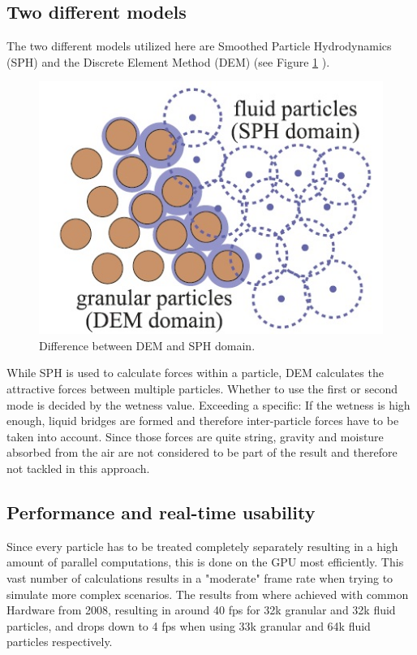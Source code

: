 \subsection{Two different models}
The two different models utilized here are Smoothed Particle Hydrodynamics (SPH) \cite{rungjiratananon2008real} and the Discrete Element Method (DEM) \cite{rungjiratananon2008real} (see Figure \ref{fig:domains} ).

\begin{figure}[htb]
	\centering
	\includegraphics[width=\linewidth]{RSKN08/domains.jpg}
	\caption{Difference between DEM and SPH domain.}
	\label{fig:domains}
\end{figure}

While SPH is used to calculate forces within a particle, DEM calculates the attractive forces between multiple particles. Whether to use the first or second mode is decided by the wetness value. Exceeding a specific: If the wetness is high enough, liquid bridges are formed and therefore inter-particle forces have to be taken into account. Since those forces are quite string, gravity and moisture absorbed from the air are not considered to be part of the result and therefore not tackled in this approach.

\subsection{Performance and real-time usability}
Since every particle has to be treated completely separately resulting in a high amount of parallel computations, this is done on the GPU most efficiently. This vast number of calculations results in a "moderate" frame rate when trying to simulate more complex scenarios. The results from \cite{rungjiratananon2008real} where achieved with common Hardware from 2008, resulting in around 40 fps for 32k granular and 32k fluid particles, and drops down to 4 fps when using 33k granular and 64k fluid particles respectively.

